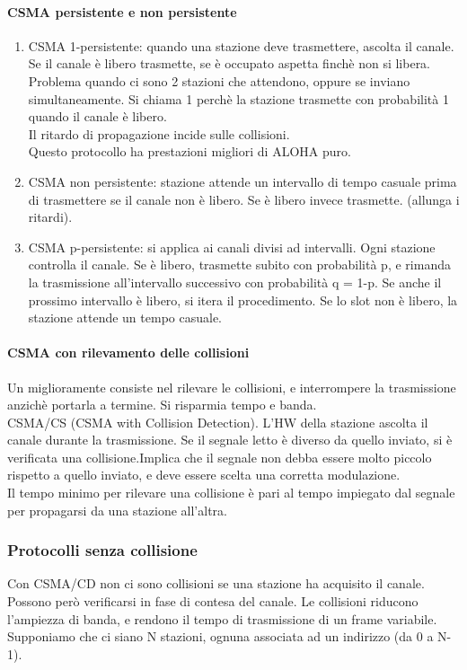 \documentclass{article}
\begin{document}
\paragraph{CSMA persistente e non persistente}
\begin{enumerate}
\item CSMA 1-persistente: quando una stazione deve trasmettere, ascolta il canale. Se il canale è libero trasmette, se è occupato aspetta finchè non si libera. Problema quando ci sono 2 stazioni che attendono, oppure se inviano simultaneamente. Si chiama 1 perchè la stazione trasmette con probabilità 1 quando il canale è libero. \\
Il ritardo di propagazione incide sulle collisioni. \\
Questo protocollo ha prestazioni migliori di ALOHA puro.
\item CSMA non persistente: stazione attende un intervallo di tempo casuale prima di trasmettere se il canale non è libero. Se è libero invece trasmette. (allunga i ritardi).
\item CSMA p-persistente: si applica ai canali divisi ad intervalli. Ogni stazione controlla il canale. Se è libero, trasmette subito con probabilità p, e rimanda la trasmissione all'intervallo successivo con probabilità q = 1-p. Se anche il prossimo intervallo è libero, si itera il procedimento. Se lo slot non è libero, la stazione attende un tempo casuale.
\end{enumerate}
\paragraph{CSMA con rilevamento delle collisioni}
Un miglioramente consiste nel rilevare le collisioni, e interrompere la trasmissione anzichè portarla a termine. Si risparmia tempo e banda.
\\CSMA/CS (CSMA with Collision Detection). L'HW della stazione ascolta il canale durante la trasmissione. Se il segnale letto è diverso da quello inviato, si è verificata una collisione.Implica che il segnale non debba essere molto piccolo rispetto a quello inviato, e deve essere scelta una corretta modulazione.\\
Il tempo minimo per rilevare una collisione è pari al tempo impiegato dal segnale per propagarsi da una stazione all'altra.
\subsubsection{Protocolli senza collisione}
Con CSMA/CD non ci sono collisioni se una stazione ha acquisito il canale. Possono però verificarsi in fase di contesa del canale. Le collisioni riducono l'ampiezza di banda, e rendono il tempo di trasmissione di un frame variabile. \\
Supponiamo che ci siano N stazioni, ognuna associata ad un indirizzo (da 0 a N-1).
\end{document}
